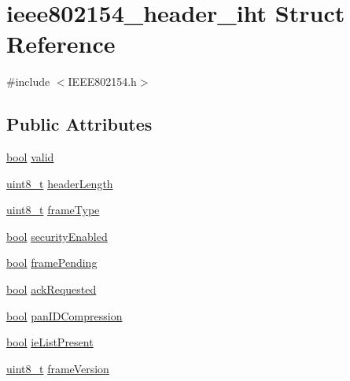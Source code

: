 \hypertarget{structieee802154__header__iht}{}\section{ieee802154\+\_\+header\+\_\+iht Struct Reference}
\label{structieee802154__header__iht}


{\ttfamily \#include $<$I\+E\+E\+E802154.\+h$>$}

\subsection*{Public Attributes}
\begin{DoxyCompactItemize}
\item 
\hyperlink{_p_e___types_8h_a97a80ca1602ebf2303258971a2c938e2}{bool} \hyperlink{structieee802154__header__iht_a679da8ba1fee3c03adde36208ef84070}{valid}
\item 
\hyperlink{_p_e___types_8h_aba7bc1797add20fe3efdf37ced1182c5}{uint8\+\_\+t} \hyperlink{structieee802154__header__iht_a589e6ebe3187e85b84d46b97c763ee18}{header\+Length}
\item 
\hyperlink{_p_e___types_8h_aba7bc1797add20fe3efdf37ced1182c5}{uint8\+\_\+t} \hyperlink{structieee802154__header__iht_a1cd5550fb1a4db909e37437e3468447e}{frame\+Type}
\item 
\hyperlink{_p_e___types_8h_a97a80ca1602ebf2303258971a2c938e2}{bool} \hyperlink{structieee802154__header__iht_a10c1770138a2323bcaf37a6a0b6c7389}{security\+Enabled}
\item 
\hyperlink{_p_e___types_8h_a97a80ca1602ebf2303258971a2c938e2}{bool} \hyperlink{structieee802154__header__iht_a5d17606145c349e3691937f4f21a5184}{frame\+Pending}
\item 
\hyperlink{_p_e___types_8h_a97a80ca1602ebf2303258971a2c938e2}{bool} \hyperlink{structieee802154__header__iht_a07cd720e8c63b0d4f0d76f91577053b0}{ack\+Requested}
\item 
\hyperlink{_p_e___types_8h_a97a80ca1602ebf2303258971a2c938e2}{bool} \hyperlink{structieee802154__header__iht_a0e893eb7bc12f48410b7bfcdcfaf596c}{pan\+I\+D\+Compression}
\item 
\hyperlink{_p_e___types_8h_a97a80ca1602ebf2303258971a2c938e2}{bool} \hyperlink{structieee802154__header__iht_a742bf0ac963d4dfef383f3874298572f}{ie\+List\+Present}
\item 
\hyperlink{_p_e___types_8h_aba7bc1797add20fe3efdf37ced1182c5}{uint8\+\_\+t} \hyperlink{structieee802154__header__iht_ad49641f0d7775ac0812cd4ec1c399297}{frame\+Version}

\end{DoxyCompactItemize}
